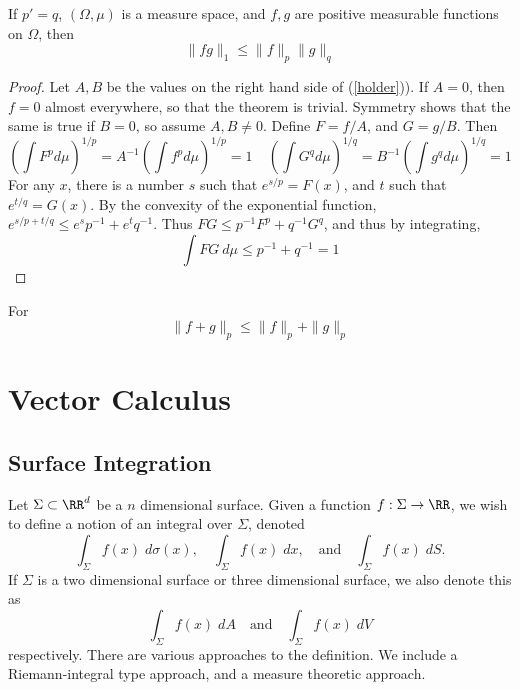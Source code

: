 \begin{theorem}[H\"{o}lder]
    If $p' = q$, $(\Omega,\mu)$ is a measure space, and $f,g$ are positive measurable functions on $\Omega$, then
    \begin{equation} \label{holder} \| fg \|_1 \leq \| f \|_p \| g \|_q \end{equation}
\end{theorem}
\begin{proof}
    Let $A,B$ be the values on the right hand side of (\ref{holder})). If $A = 0$, then $f = 0$ almost everywhere, so that the theorem is trivial. Symmetry shows that the same is true if $B = 0$, so assume $A, B \neq 0$. Define $F = f/A$, and $G = g/B$. Then
    \[ \left( \int F^p d\mu \right)^{1/p} = A^{-1} \left( \int f^p d\mu \right)^{1/p} = 1\ \ \ \ \ \left( \int G^q d\mu \right)^{1/q} = B^{-1} \left( \int g^q d\mu \right)^{1/q} = 1 \]
    For any $x$, there is a number $s$ such that $e^{s/p} = F(x)$, and $t$ such that $e^{t/q} = G(x)$. By the convexity of the exponential function, $e^{s/p + t/q} \leq e^s p^{-1} + e^t q^{-1}$. Thus $FG \leq p^{-1} F^p + q^{-1} G^q$, and thus by integrating,
    \[ \int FG\ d\mu \leq p^{-1} + q^{-1} = 1 \]
\end{proof}

\begin{corollary}[Minkowski]
    For
    \[ \| f + g \|_p \leq \| f \|_p + \| g \|_p \]
\end{corollary}

\chapter{Vector Calculus}

\section{Surface Integration}

Let $\Sigma \subset \RR^d$ be a $n$ dimensional surface. Given a function $f: \Sigma \to \RR$, we wish to define a notion of an integral over $\Sigma$, denoted
%
\[ \int_\Sigma f(x)\; d\sigma(x),\quad \int_\Sigma f(x)\; dx,\quad \text{and}\quad \int_\Sigma f(x)\; dS. \]
%
If $\Sigma$ is a two dimensional surface or three dimensional surface, we also denote this as
%
\[ \int_\Sigma f(x)\; dA \quad\text{and}\quad \int_\Sigma f(x)\; dV \]
%
respectively. There are various approaches to the definition. We include a Riemann-integral type approach, and a measure theoretic approach.

